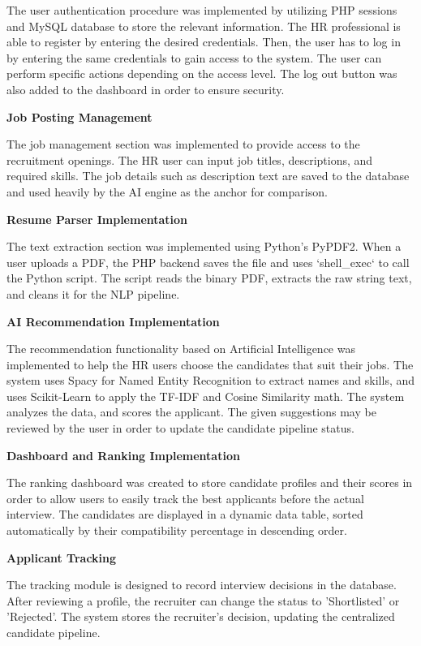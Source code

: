 \documentclass[12pt,a4paper]{report}
\begin{document}
The user authentication procedure was implemented by utilizing PHP sessions and
MySQL database to store the relevant information. The HR professional is able to register
by entering the desired credentials. Then, the user has to log in by entering
the same credentials to gain access to the system. The user can perform specific
actions depending on the access level. The log out button was also added to the
dashboard in order to ensure security.

\textbf{Job Posting Management}

The job management section was implemented to provide access to the
recruitment openings. The HR user can input job titles, descriptions, and required skills. The job details
such as description text are saved to the database and used heavily by the AI engine as the anchor for comparison.

\textbf{Resume Parser Implementation}

The text extraction section was implemented using Python's PyPDF2.
When a user uploads a PDF, the PHP backend saves the file and uses `shell_exec` to call the Python script. The script reads the binary PDF, extracts the raw string text, and cleans it for the NLP pipeline. 

\textbf{AI Recommendation Implementation}

The recommendation functionality based on Artificial Intelligence was
implemented to help the HR users choose the candidates that suit their
jobs. The system uses Spacy for Named Entity Recognition to extract names and skills, and uses Scikit-Learn to apply the TF-IDF and Cosine Similarity math. The system analyzes the data, and scores the applicant. The given suggestions
may be reviewed by the user in order to update the candidate pipeline status.

\textbf{Dashboard and Ranking Implementation}

The ranking dashboard was created to store candidate profiles and their scores in order
to allow users to easily track the best applicants before the actual interview.
The candidates are displayed in a dynamic data table, sorted automatically by their compatibility percentage in descending order.

\textbf{Applicant Tracking}

The tracking module is designed to record interview decisions in the
database. After reviewing a profile, the recruiter can change the status to 'Shortlisted' or 'Rejected'. The system stores the recruiter's decision, updating the centralized candidate pipeline.
\end{document}
